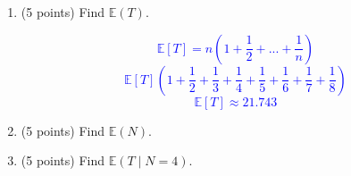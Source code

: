 \documentclass{article}
\begin{document}
\begin{enumerate}[label=(\alph*)]
    \item (5 points) Find $\mathbb{E}(T)$.

    \textcolor{blue}{$$\mathbb{E}[T]=n\left( 1 + \frac{1}{2} + ... + \frac{1}{n}\right)$$
    $$\mathbb{E}[T]\left( 1 + \frac{1}{2} + \frac{1}{3} + \frac{1}{4} + \frac{1}{5} + \frac{1}{6} + \frac{1}{7} + \frac{1}{8} \right)$$
$$\mathbb{E}[T]\approx 21.743$$}

    \item (5 points) Find $\mathbb{E}(N)$.

    \textcolor{blue}{}

    \item (5 points) Find $\mathbb{E}(T \mid N = 4)$.

    \textcolor{blue}{}

\end{enumerate}
\end{document}
